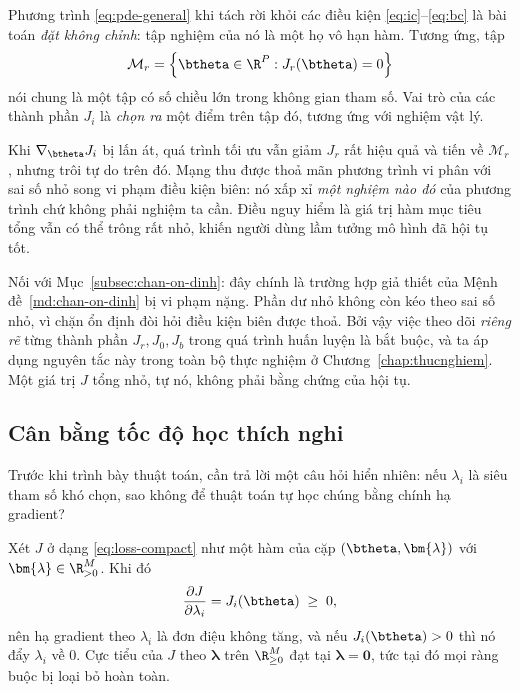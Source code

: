 \begin{nhanxet}
\label{rem:ill-posedness}
Phương trình \eqref{eq:pde-general} khi tách rời khỏi các điều kiện
\eqref{eq:ic}--\eqref{eq:bc} là bài toán \emph{đặt không chỉnh}: tập nghiệm của
nó là một họ vô hạn hàm. Tương ứng, tập
\begin{equation}
\mathcal{M}_{r}
 = \left\{ \btheta \in \R^{P} : J_{r}(\btheta) = 0 \right\}
\label{eq:manifold-r}
\end{equation}
nói chung là một tập có số chiều lớn trong không gian tham số. Vai trò của các
thành phần $J_{i}$ là \emph{chọn ra} một điểm trên tập đó, tương ứng với nghiệm
vật lý.
 
Khi $\nabla_{\btheta} J_{i}$ bị lấn át, quá trình tối ưu vẫn giảm $J_{r}$ rất
hiệu quả và tiến về $\mathcal{M}_{r}$, nhưng trôi tự do trên đó. Mạng thu được
thoả mãn phương trình vi phân với sai số nhỏ song vi phạm điều kiện biên: nó xấp
xỉ \emph{một nghiệm nào đó} của phương trình chứ không phải nghiệm ta cần. Điều
nguy hiểm là giá trị hàm mục tiêu tổng vẫn có thể trông rất nhỏ, khiến người dùng
lầm tưởng mô hình đã hội tụ tốt.
 
Nối với Mục~\ref{subsec:chan-on-dinh}: đây chính là trường hợp giả thiết của
Mệnh đề~\ref{md:chan-on-dinh} bị vi phạm nặng. Phần dư nhỏ không còn kéo theo sai
số nhỏ, vì chặn ổn định đòi hỏi điều kiện biên được thoả. Bởi vậy việc theo dõi
\emph{riêng rẽ} từng thành phần $J_{r}, J_{0}, J_{b}$ trong quá trình huấn luyện
là bắt buộc, và ta áp dụng nguyên tắc này trong toàn bộ thực nghiệm ở
Chương~\ref{chap:thucnghiem}. Một giá trị $J$ tổng nhỏ, tự nó, không phải bằng
chứng của hội tụ.
\end{nhanxet}
 
\subsection{Cân bằng tốc độ học thích nghi}
\label{subsec:annealing}
 
Trước khi trình bày thuật toán, cần trả lời một câu hỏi hiển nhiên: nếu
$\lambda_i$ là siêu tham số khó chọn, sao không để thuật toán tự học chúng bằng
chính hạ gradient?
 
\begin{bode}
\label{bd:lambda-tam-thuong}
Xét $J$ ở dạng \eqref{eq:loss-compact} như một hàm của cặp
$(\btheta, \bm{\lambda})$ với $\bm{\lambda} \in \R^{M}_{>0}$. Khi đó
\begin{equation}
\frac{\partial J}{\partial \lambda_{i}} = J_{i}(\btheta) \;\ge\; 0 ,
\label{eq:dJ-dlambda}
\end{equation}
nên hạ gradient theo $\lambda_i$ là đơn điệu không tăng, và nếu
$J_i(\btheta) > 0$ thì nó đẩy $\lambda_{i}$ về $0$. Cực tiểu của $J$ theo
$\bm{\lambda}$ trên $\R^M_{\ge 0}$ đạt tại $\bm{\lambda} = \bm{0}$, tức tại đó
mọi ràng buộc bị loại bỏ hoàn toàn.
\end{bode}
 
